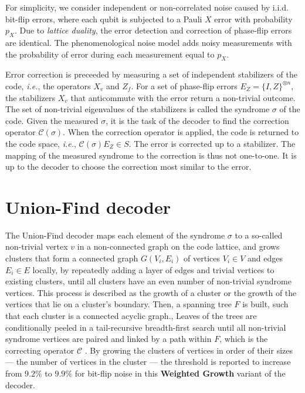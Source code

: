 For simplicity, we consider independent or non-correlated noise caused by i.i.d. bit-flip errors, where each qubit is subjected to a Pauli $X$ error with probability $p_X$. Due to \emph{lattice duality}, the error detection and correction of phase-flip errors are identical. The phenomenological noise model adds noisy measurements with the probability of error during each measurement equal to $p_X$. 

Error correction is preceeded by measuring a set of independent stabilizers of the code, \emph{i.e.}, the operators $X_v$ and $Z_f$. For a set of phase-flip errors $E_Z = \{I,Z\}^{\otimes n}$, the stabilizers $X_v$ that anticommute with the error return a non-trivial outcome. The set of non-trivial eigenvalues of the stabilizers is called the syndrome $\sigma$ of the code. Given the measured $\sigma$, it is the task of the decoder to find the correction operator $\mathcal{C}(\sigma)$. When the correction operator is applied, the code is returned to the code space, \emph{i.e.}, $\mathcal{C}(\sigma)E_Z \in S$. The error is corrected up to a stabilizer. The mapping of the measured syndrome to the correction is thus not one-to-one. It is up to the decoder to choose the correction most similar to the error. 

\section{Union-Find decoder}\label{sec:unionfind}

The Union-Find decoder \cite{delfosse2017almost} maps each element of the syndrome $\sigma$ to a so-called non-trivial vertex $v$ in a non-connected graph on the code lattice, and grows clusters that form a connected graph $G(V_i, E_i)$ of vertices $V_i\in V$ and edges $E_i \in E$ locally, by repeatedly adding a layer of edges and trivial vertices to existing clusters, until all clusters have an even number of non-trivial syndrome vertices. This process is described as the growth of a cluster or the growth of the vertices that lie on a cluster's boundary. Then, a spanning tree $F$ is built, such that each cluster is a connected acyclic graph., Leaves of the trees are conditionally peeled in a tail-recursive breadth-first search until all non-trivial syndrome vertices are paired and linked by a path within $F$, which is the correcting operator $\mathcal{C}$ \cite{delfosse2017linear}. By growing the clusters of vertices in order of their sizes --- the number of vertices in the cluster --- the threshold is reported to increase from $9.2\%$ to $9.9\%$ for bit-flip noise in this \textbf{Weighted Growth} variant of the decoder.

